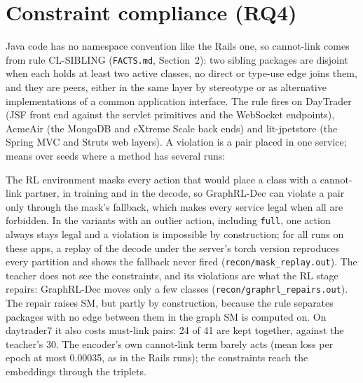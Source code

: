 \documentclass[10pt,a4paper]{article}
\begin{document}
\section{Constraint compliance (RQ4)}\label{sec:cl}
Java code has no namespace convention like the Rails one, so cannot-link comes from rule CL-SIBLING (\texttt{FACTS.md}, Section~2): two sibling packages are disjoint when each holds at least two active classes, no direct or type-use edge joins them, and they are peers, either in the same layer by stereotype or as alternative implementations of a common application interface. The rule fires on DayTrader (JSF front end against the servlet primitives and the WebSocket endpoints), AcmeAir (the MongoDB and eXtreme Scale back ends) and lit-jpetstore (the Spring MVC and Struts web layers). A violation is a pair placed in one service; means over seeds where a method has several runs:
\begin{center}\small{}\end{center}
The RL environment masks every action that would place a class with a cannot-link partner, in training and in the decode, so GraphRL-Dec can violate a pair only through the mask's fallback, which makes every service legal when all are forbidden. In the variants with an outlier action, including \texttt{full}, one action always stays legal and a violation is impossible by construction; for all runs on these apps, a replay of the decode under the server's torch version reproduces every partition and shows the fallback never fired (\texttt{recon/mask\_replay.out}). The teacher does not see the constraints, and its violations are what the RL stage repairs: GraphRL-Dec moves only a few classes (\texttt{recon/graphrl\_repairs.out}). The repair raises SM, but partly by construction, because the rule separates packages with no edge between them in the graph SM is computed on. On daytrader7 it also costs must-link pairs: 24 of 41 are kept together, against the teacher's 30. The encoder's own cannot-link term barely acts (mean loss per epoch at most 0.00035, as in the Rails runs); the constraints reach the embeddings through the triplets.
\end{document}
